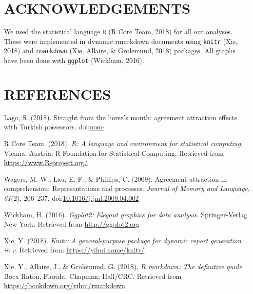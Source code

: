 \documentclass[doc]{apa6}
\begin{document}
\section{ACKNOWLEDGEMENTS}\label{acknowledgements}

We used the statistical language \texttt{R} (R Core Team, 2018) for all
our analyses. These were implemented in dynamic rmarkdown documents
using \texttt{knitr} (Xie, 2018) and \texttt{rmarkdown} (Xie, Allaire,
\& Grolemund, 2018) packages. All graphs have been done with
\texttt{ggplot} (Wickham, 2016).

\section*{REFERENCES}\label{references}

\hypertarget{refs}{}
\hypertarget{ref-Lago}{}
Lago, S. (2018). Straight from the horse's mouth: agreement attraction
effects with Turkish possessors. doi:\href{https://doi.org/none}{none}

\hypertarget{ref-R_Core_Team_2018}{}
R Core Team. (2018). \emph{R: A language and environment for statistical
computing}. Vienna, Austria: R Foundation for Statistical Computing.
Retrieved from \url{https://www.R-project.org/}

\hypertarget{ref-Wagers2009}{}
Wagers, M. W., Lau, E. F., \& Phillips, C. (2009). Agreement attraction
in comprehension: Representations and processes. \emph{Journal of Memory
and Language}, \emph{61}(2), 206--237.
doi:\href{https://doi.org/10.1016/j.jml.2009.04.002}{10.1016/j.jml.2009.04.002}

\hypertarget{ref-Wickham_2016}{}
Wickham, H. (2016). \emph{Ggplot2: Elegant graphics for data analysis}.
Springer-Verlag New York. Retrieved from \url{http://ggplot2.org}

\hypertarget{ref-Xie_2018}{}
Xie, Y. (2018). \emph{Knitr: A general-purpose package for dynamic
report generation in r}. Retrieved from \url{https://yihui.name/knitr/}

\hypertarget{ref-Xie_2018a}{}
Xie, Y., Allaire, J., \& Grolemund, G. (2018). \emph{R markdown: The
definitive guide}. Boca Raton, Florida: Chapman; Hall/CRC. Retrieved
from \url{https://bookdown.org/yihui/rmarkdown}
\end{document}
